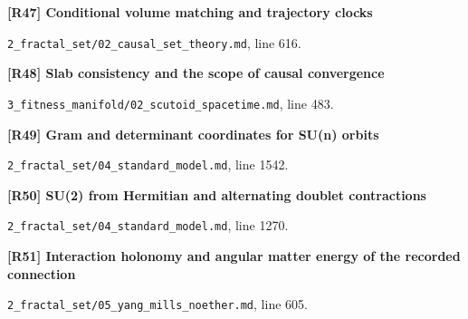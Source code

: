 \documentclass[11pt,a4paper]{article}
\begin{document}
\par\medskip\noindent\begin{minipage}{\linewidth}\textbf{[R47] Conditional volume matching and trajectory clocks}\label{src:thm-fractal-faithful-embedding}\par
{\small\texttt{}\par
\nolinkurl{2_fractal_set/02_causal_set_theory.md}, line 616.\par}
\end{minipage}\par

\par\medskip\noindent\begin{minipage}{\linewidth}\textbf{[R48] Slab consistency and the scope of causal convergence}\label{src:prop-scutoid-cst-compatibility}\par
{\small\texttt{}\par
\nolinkurl{3_fitness_manifold/02_scutoid_spacetime.md}, line 483.\par}
\end{minipage}\par

\par\medskip\noindent\begin{minipage}{\linewidth}\textbf{[R49] Gram and determinant coordinates for SU(n) orbits}\label{src:thm-sm-direct-orbit-isomorphism}\par
{\small\texttt{}\par
\nolinkurl{2_fractal_set/04_standard_model.md}, line 1542.\par}
\end{minipage}\par

\par\medskip\noindent\begin{minipage}{\linewidth}\textbf{[R50] SU(2) from Hermitian and alternating doublet contractions}\label{src:thm-sm-direct-su2-invariants}\par
{\small\texttt{}\par
\nolinkurl{2_fractal_set/04_standard_model.md}, line 1270.\par}
\end{minipage}\par

\par\medskip\noindent\begin{minipage}{\linewidth}\textbf{[R51] Interaction holonomy and angular matter energy of the recorded connection}\label{src:prop-ym-recorded-interaction-sector}\par
{\small\texttt{}\par
\nolinkurl{2_fractal_set/05_yang_mills_noether.md}, line 605.\par}
\end{minipage}\par
\end{document}
